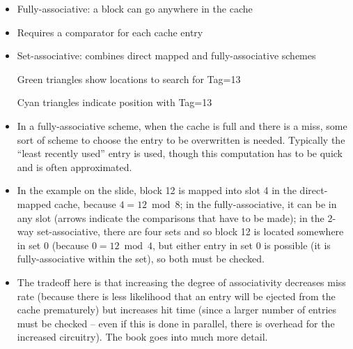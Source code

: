 




\begin{frame}[fragile]
\begin{itemize}
\item Fully-associative: a block can go anywhere in the cache
\item Requires a comparator for each cache entry
\item Set-associative: combines direct mapped and fully-associative schemes


  Green triangles show locations to search for Tag=13
  
  Cyan triangles indicate position with Tag=13
\end{itemize}
\BNotes\ifnum{}
\begin{itemize}
\item In a fully-associative scheme, when the cache is full and there
is a miss, some sort of scheme to choose the entry to be overwritten is
needed. Typically the ``least recently used'' entry is used, though
this computation has to be quick and is often approximated.
\item
In the example on the slide, block 12 is mapped into slot 4 in the
direct-mapped cache, because $4 = 12 \bmod 8$; in the
fully-associative, it can be in any slot (arrows indicate the
comparisons that have to be made); in the 2-way set-associative, there
are four sets and so block 12 is located somewhere in set 0 (because
$0 = 12 \bmod 4$, but either entry in set 0 is possible (it is
fully-associative within the set), so both must be checked.
\item
The tradeoff here is that increasing the degree of associativity
decreases miss rate (because there is less likelihood that an entry
will be ejected from the cache prematurely) but increases hit time
(since a larger number of entries must be checked -- even if this is
done in parallel, there is overhead for the increased circuitry). The
book goes into much more detail.
\end{itemize}
\fi\ENotes
\end{frame}



